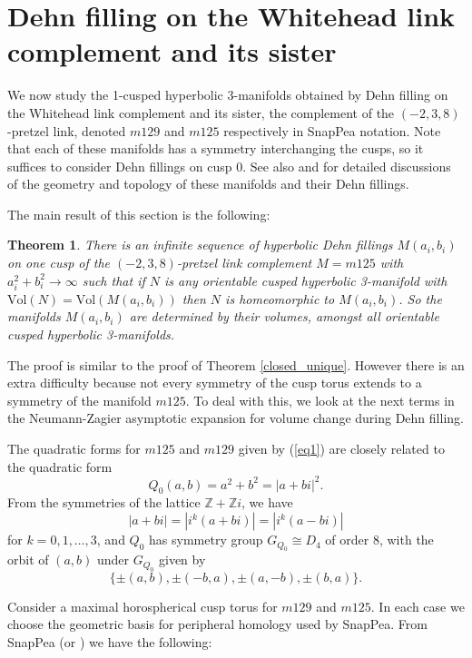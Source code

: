 \documentclass[reqno]{amsproc}  %
\newtheorem{thm}[prop]{\bf Theorem}
\def\Z{\mathbb{Z}}
\def\vol{\text{Vol} }
\begin{document}
\section{Dehn filling on the Whitehead link complement and its sister}

We now study  the 1-cusped hyperbolic 3-manifolds obtained 
by  Dehn filling on the Whitehead link complement and its sister,  
the complement of the $(-2,3,8)$-pretzel link, denoted 
$m129$ and $m125$ respectively in SnapPea notation.
Note that each of these manifolds has a symmetry interchanging the cusps, so it suffices
to consider Dehn fillings on cusp 0.
See  also \cite{HMW,NR} and \cite{AD} for detailed discussions
of the geometry and topology of these manifolds and their Dehn fillings.

\medskip
The main result of this section is the following:

\begin{thm}  \label{cusped_unique}
There is an infinite sequence of hyperbolic Dehn fillings $M(a_i,b_i)$
on one cusp of the $(-2,3,8)$-pretzel link complement $M=m125$ with $a_i^2+b_i^2 \to  \infty$
such that if $N$ is any orientable cusped hyperbolic 3-manifold with 
$\vol(N)=\vol(M(a_i,b_i))$ then $N$ is homeomorphic to $M(a_i,b_i)$.
So the manifolds $M(a_i,b_i)$ are determined by their volumes, amongst all 
orientable cusped hyperbolic 3-manifolds.
\end{thm}

The proof is similar to the proof of Theorem \ref{closed_unique}. However there
is an extra difficulty because not every symmetry of the cusp torus extends to a symmetry
of the manifold $m125$. To deal with this, we look at the next terms in the Neumann-Zagier asymptotic 
expansion for  volume change during Dehn filling. 

\smallskip
The quadratic forms for $m125$ and $m129$ given by (\ref{eq1}) 
are closely related to the quadratic form
\begin{equation}  \label{eq15}
Q_0(a,b) = a^2+ b^2 = |a+b i|^2 .
\end{equation} 
From the symmetries of the lattice $\Z+\Z i$, we have
$$|a+b i | = | i^k(a+b i)| = | i^k(a- b i)| $$
for $k =0, 1, \ldots, 3$,
and $Q_0$ has symmetry group $G_{Q_0} \cong D_4$ of order 8, with the orbit
of $(a,b)$ under $G_{Q_0}$ given by
\begin{equation}  \label{eq16}
\{  \pm(a, b), \pm(-b,a), \pm(a,-b), \pm(b,a) \}.
\end{equation} 

Consider a maximal horospherical cusp torus for $m129$ and $m125$.
In each case we choose the geometric basis for peripheral homology used by SnapPea.
From SnapPea (or \cite{HMW, NR, AD}) we have the following:
\end{document}
